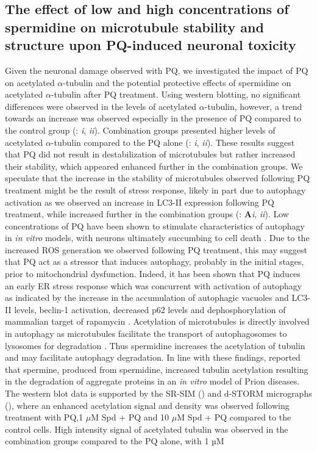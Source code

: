 \subsection{ The effect of low and high concentrations of spermidine on microtubule stability and structure upon PQ-induced neuronal toxicity}
Given the neuronal damage observed with PQ, we investigated the impact of PQ on acetylated $\alpha$-tubulin and the potential protective effects of spermidine on acetylated $\alpha$-tubulin after PQ treatment. Using western blotting, no significant differences were observed in the levels of acetylated $\alpha$-tubulin, however, a trend towards an increase was observed especially in the presence of PQ compared to the control group (: \textit{i}, \textit{ii}). Combination groups presented higher levels of acetylated $\alpha$-tubulin compared to the PQ alone (: \textit{i}, \textit{ii}). These results suggest that PQ did not result in destabilization of microtubules but rather increased their stability, which appeared enhanced further in the combination groups. We speculate that the increase in the stability of microtubules observed following PQ treatment might be the result of stress response, likely in part due to autophagy activation as we observed an increase in LC3-II expression following PQ treatment, while increased further in the combination groups (: \textbf{A}\textit{i}, \textit{ii}). Low concentrations of PQ have been shown to stimulate characteristics of autophagy in \textit{in vitro} models, with neurons ultimately succumbing to cell death \citep{Gonzalez-Polo2009,Gonzalez-Polo2007a,Gonzalez-Polo2007b,Niso-Santano2006}. Due to the increased ROS generation we observed following PQ treatment, this may suggest that PQ act as a stressor that induces autophagy, probably in the initial stages, prior to mitochondrial dysfunction. Indeed, it has been shown that PQ induces an early ER stress response which was concurrent with activation of autophagy as indicated by the increase in the accumulation of autophagic vacuoles and LC3-II levels, beclin-1 activation, decreased p62 levels and dephosphorylation of  mammalian target of rapamycin \citep{Gonzalez-Polo2007a,Gonzalez-Polo2007b,Niso-Santano2011}. Acetylation of microtubules is directly involved in autophagy as microtubules facilitate the transport of autophagosomes to lysosomes for degradation \citep{Phadwal2018,Xie2010}. Thus spermidine increases the acetylation of tubulin and may facilitate autophagy degradation. In line with these findings, \citet{Phadwal2018} reported that spermine, produced from spermidine, increased tubulin acetylation resulting in the degradation of aggregate proteins in an \textit{in vitro} model of Prion diseases. The western blot data is supported by the SR-SIM () and d-STORM micrographs (), where an enhanced acetylation signal and density was observed following treatment with PQ,1 $\mu$M Spd + PQ and 10 $\mu$M Spd + PQ compared to the control cells. High intensity signal of acetylated tubulin was observed in the combination groups compared to the PQ alone, with 1 µM 